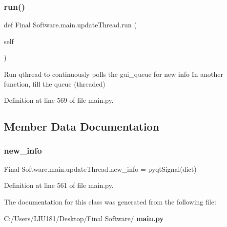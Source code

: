 \subsubsection{run()}
{\footnotesize\ttfamily def Final Software.\+main.\+update\+Thread.\+run (\begin{DoxyParamCaption}\item[{}]{self }\end{DoxyParamCaption})}

\begin{DoxyVerb}Run qthread to continuously polls the gui_queue for new info
In another function, fill the queue (threaded)
\end{DoxyVerb}
 

Definition at line 569 of file main.\+py.



\subsection{Member Data Documentation}
\mbox{\label{class_final_01_software_1_1main_1_1update_thread_a4f358d599a7ed2dc805376bbe9f80187}} 
\subsubsection{new\_info}
{\footnotesize\ttfamily Final Software.\+main.\+update\+Thread.\+new\+\_\+info = pyqt\+Signal(dict)\hspace{0.3cm}{\ttfamily [static]}}



Definition at line 561 of file main.\+py.



The documentation for this class was generated from the following file\+:\begin{DoxyCompactItemize}
\item 
C\+:/\+Users/\+L\+I\+U181/\+Desktop/\+Final Software/\textbf{ main.\+py}\end{DoxyCompactItemize}

